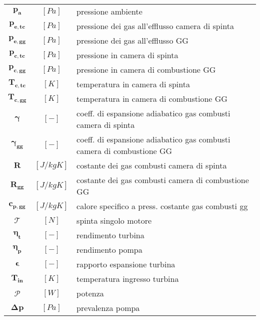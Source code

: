\begin{multicols}{2}
\begin{tabularx}{\linewidth}{cc>{\raggedright\arraybackslash}X}
		$\bm{p_a}$ & $[Pa]$ & pressione ambiente \\
		$\bm{p_{e,tc}}$ & $[Pa]$ & pressione dei gas all'efflusso camera di spinta \\
		$\bm{p_{e,gg}}$ & $[Pa]$ & pressione dei gas all'efflusso GG\\
		$\bm{p_{c,tc}}$ & $[Pa]$ & pressione in camera di spinta\\
		$\bm{p_{c,gg}}$ & $[Pa]$ & pressione in camera di combustione GG\\
		$\bm{T_{c,tc}}$ & $[K]$ & temperatura in camera di spinta\\
		$\bm{T_{c,gg}}$ & $[K]$ & temperatura in camera di combustione GG\\
		$\bm{\gamma}$ & $[-]$ & coeff. di espansione adiabatico gas combusti camera di spinta\\
		$\bm{\gamma_{gg}}$ & $[-]$ & coeff. di espansione adiabatico gas combusti camera di combustione GG\\
		$\bm{R}$ & $[J/kgK]$ & costante dei gas combusti camera di spinta\\
		$\bm{R_{gg}}$ & $[J/kgK]$ & costante dei gas combusti camera di combustione GG\\
		$\bm{c_{p,gg}}$ & $[J/kgK]$ & calore specifico a press. costante gas combusti gg\\
		$\bm{\mathcal{T}}$ & $[N]$ & spinta singolo motore\\
		$\bm{\eta_t}$ & $[-]$ & rendimento turbina\\
		$\bm{\eta_p}$ & $[-]$ & rendimento pompa\\
		$\bm{\epsilon}$ & $[-]$ & rapporto espansione turbina\\
		$\bm{T_{in}}$ & $[K]$ & temperatura ingresso turbina\\
		$\bm{\mathcal{P}}$ & $[W]$ & potenza\\
		$\bm{\Delta p}$ & $[Pa]$ & prevalenza pompa
	\end{tabularx}


\end{multicols}
